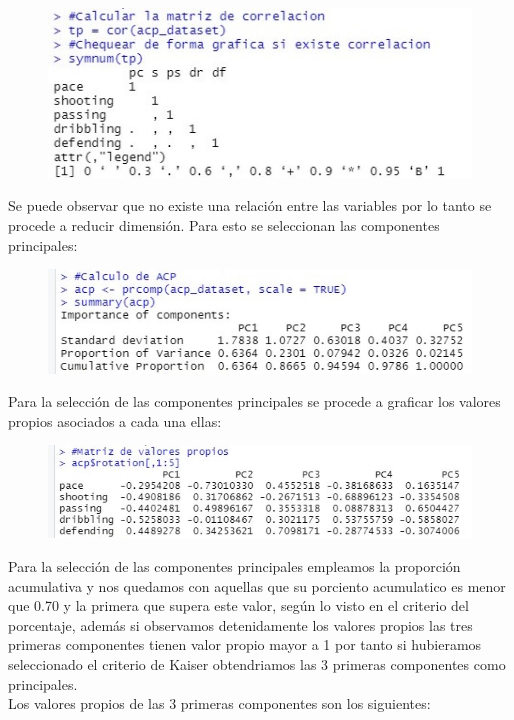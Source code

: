 \documentclass[a4paper,10pt,twocolumn]{article}
\begin{document}
\begin{figure}[h]
	\includegraphics[scale=0.7]{./imgs/acp_correlation.jpg}
\end{figure}

Se puede observar que no existe una relación entre las variables por lo tanto se procede a reducir dimensión. Para esto se seleccionan las componentes principales:

\begin{figure}[h]
	\includegraphics[scale=0.6]{./imgs/acp_summary.jpg}
\end{figure}

Para la selección de las componentes principales se procede a graficar los valores propios asociados a cada una ellas:

\begin{figure}[h]
	\includegraphics[scale=0.1]{./imgs/acp_vp.jpg}
\end{figure}


Para la selecci\'on de las componentes principales empleamos la proporci\'on acumulativa y nos quedamos con aquellas que su porciento acumulatico es menor que 0.70 y la primera que supera este valor, seg\'un lo visto en el criterio del porcentaje, adem\'as si observamos detenidamente los valores propios las tres primeras componentes tienen valor propio mayor a 1 por tanto si hubieramos seleccionado el criterio de Kaiser obtendriamos las 3 primeras componentes como principales.\\
Los valores propios de las 3 primeras componentes son los siguientes:
\end{document}
